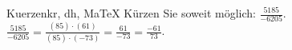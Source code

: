 \begin{MAufgabe}{Kuerzen}{kr, dh, MaTeX}
K\"urzen Sie soweit m\"oglich: $\frac{5185}{-6205}$.\\ 
\ifLsg\MLoesung
\quad $\frac{5185}{-6205}=\frac{(85)\cdot(61)}{(85)\cdot(-73)}=\frac{61}{-73}=\frac{-61}{73}$.\else\relax\fi
 \end{MAufgabe}